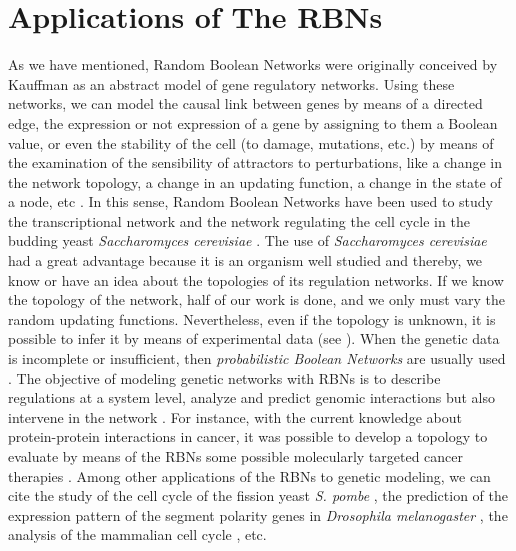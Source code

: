 \section{Applications of The RBNs}
\label{Applications_RBN}
As we have mentioned, Random Boolean Networks were originally conceived by Kauffman as an abstract model of gene regulatory networks. Using these networks, we can model the causal link between genes by means of a directed edge, the expression or not expression of a gene by assigning to them a Boolean value, or even the stability of the cell (to damage, mutations, etc.) by means of the examination of  the sensibility of attractors to perturbations, like a change in the network topology, a change in an updating function, a change in the state of a node, etc \cite{kauffman_analysis_applications}. In this sense, Random Boolean Networks have been used to study the transcriptional network and the network regulating the cell cycle in the budding yeast \textit{Saccharomyces cerevisiae} \cite{yeast_rbn_kauffman} \cite{yeast_rbn}. The use of \textit{Saccharomyces cerevisiae} had a great advantage because it is an organism well studied and thereby, we know or have an idea about the topologies of its regulation networks. If we know the topology of the network, half of our work is done, and we only must vary the random updating functions. Nevertheless, even if the topology is unknown, it is possible to infer it by means of experimental data (see \cite{model_construction_rbn}). When the genetic data is incomplete or insufficient, then \textit{probabilistic Boolean Networks} are usually used \cite{rbn_carlos}. The objective of modeling genetic networks with RBNs is to describe regulations at a system level, analyze and predict genomic interactions but also intervene in the network \cite{tutorial_rbn}. For instance, with the current knowledge about protein-protein interactions in cancer, it was possible to develop a topology to evaluate by means of the RBNs some possible molecularly targeted cancer therapies \cite{cancer_rbn}. Among other applications of the RBNs to genetic modeling, we can cite the study of the cell cycle of the fission yeast \textit{S. pombe} \cite{prospects_rbn}, the prediction of the expression pattern of the segment polarity genes in \textit{Drosophila melanogaster} \cite{drosophila_rbn}, the analysis of the mammalian cell cycle \cite{mammalian_rbn}, etc.\\

